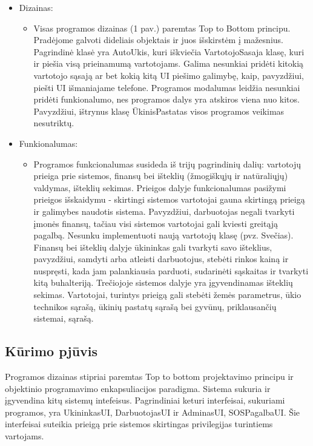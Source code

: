 \documentclass[oneside]{VUMIFPSkursinis}
\begin{document}
	\begin{itemize}
		\item Dizainas:
			\begin{itemize}
				\item Visas programos dizainas (1 pav.) paremtas Top to Bottom principu. Pradėjome galvoti dideliais objektais ir juos išskirstėm į mažesnius. Pagrindinė klasė yra AutoUkis, kuri iškviečia VartotojoSasaja klasę, kuri ir piešia visą prieinamumą vartotojams. Galima nesunkiai pridėti kitokią vartotojo sąsają ar bet kokią kitą UI piešimo galimybę, kaip, pavyzdžiui, piešti UI išmaniajame telefone. Programos modalumas leidžia nesunkiai pridėti funkionalumo, nes programos dalys yra atskiros viena nuo kitos. Pavyzdžiui, ištrynus klasę ŪkinisPastatas visos programos veikimas nesutriktų. 
			\end{itemize}
\pagebreak
		\item Funkionalumas: 
			\begin{itemize}
				\item Programos funkcionalumas susideda iš trijų pagrindinių dalių: vartotojų prieiga prie sistemos, finansų bei išteklių (žmogiškųjų ir natūraliųjų) valdymas, išteklių sekimas. Prieigos dalyje funkcionalumas pasižymi prieigos išskaidymu - skirtingi sistemos vartotojai gauna skirtingą prieigą ir galimybes naudotis sistema. Pavyzdžiui, darbuotojas negali tvarkyti įmonės finansų, tačiau visi sistemos vartotojai gali kviesti greitąją pagalbą. Nesunku implementuoti naują vartotojų klasę (pvz. Svečias). Finansų bei išteklių dalyje ūkininkas gali tvarkyti savo išteklius, pavyzdžiui, samdyti arba atleisti darbuotojus, stebėti rinkos kainą ir nuspręsti, kada jam palankiausia parduoti, sudarinėti sąskaitas ir tvarkyti kitą buhalteriją. Trečiojoje sistemos dalyje yra įgyvendinamas išteklių sekimas. Vartotojai, turintys prieigą gali stebėti žemės parametrus, ūkio technikos sąrašą, ūkinių pastatų sąrašą bei gyvūnų, priklausančių sistemai, sąrašą.
			\end{itemize}
	\end{itemize}
\pagebreak



\subsection{Kūrimo pjūvis}
Programos dizainas stipriai paremtas Top to bottom projektavimo principu ir objektinio programavimo enkapsuliacijos paradigma. Sistema sukuria ir įgyvendina kitų sistemų intefeisus. Pagrindiniai keturi interfeisai, sukuriami programos, yra UkininkasUI, DarbuotojasUI ir AdminasUI, SOSPagalbaUI. Šie interfeisai suteikia prieigą prie sistemos skirtingas privilegijas turintiems vartojams.
\end{document}
